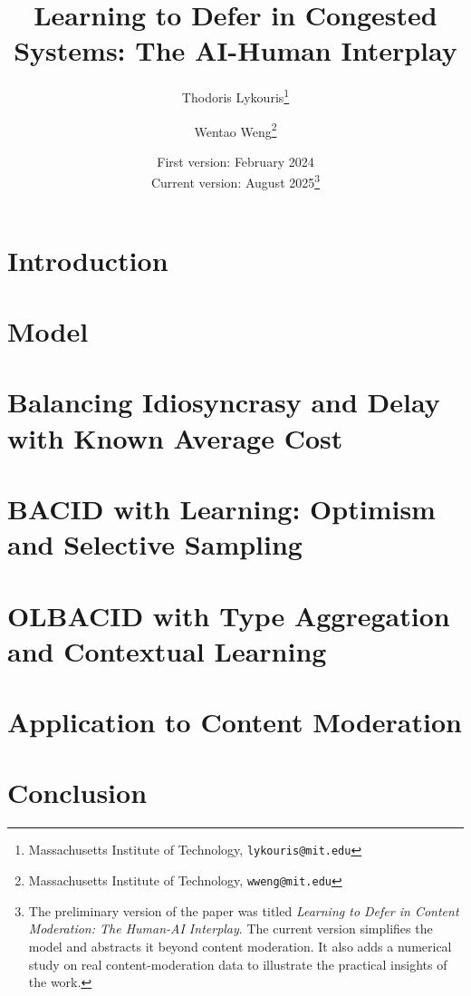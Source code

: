 \documentclass[11pt]{article}
\title{Learning to Defer in Congested Systems: The AI-Human Interplay}
\author{Thodoris Lykouris\thanks{Massachusetts Institute of Technology, \texttt{lykouris@mit.edu}} 
\and Wentao Weng\thanks{Massachusetts Institute of Technology, \texttt{wweng@mit.edu}}}
\date{First version: February 2024\\Current version: August 2025\footnote{The preliminary version of the paper was titled \emph{Learning to Defer in Content Moderation: The Human-AI Interplay}. The current version simplifies the model and abstracts it beyond content moderation. It also adds a numerical study on real content-moderation data to illustrate the practical insights of the work.}}
\begin{document}
\maketitle
\thispagestyle{empty}

\begin{abstract}

\end{abstract}

\newpage
\setcounter{page}{1}

\section{Introduction}\label{sec:intro}


\section{Model}\label{sec:model}


\section{Balancing Idiosyncrasy and Delay with Known Average Cost}\label{sec:known}


\section{\textsc{BACID} with Learning: Optimism and Selective Sampling}\label{sec:unknown}


\section{\textsc{OLBACID} with Type Aggregation and Contextual Learning}\label{sec:contextual}



\section{Application to Content Moderation}
\label{sec:content_moderation}


\section{Conclusion}\label{sec:conclusion}





\appendix
\end{document}
